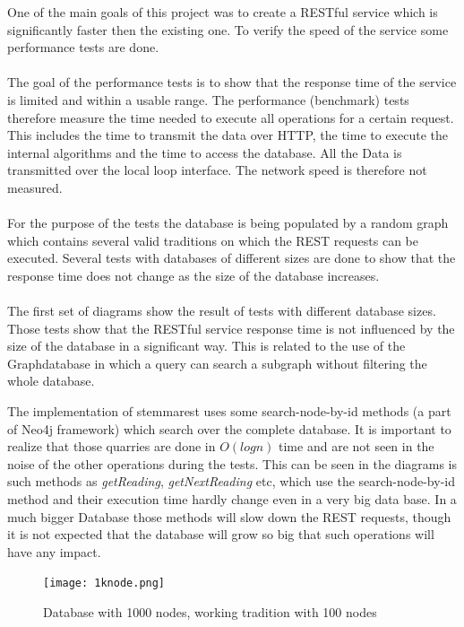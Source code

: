 \documentclass[11pt,fleqn,openany]{book} %
\begin{document}
One of the main goals of this project was to create a RESTful service which is significantly faster then the existing one. To verify the speed of the service some performance tests are done. 
\\ \quad \\
The goal of the performance tests is to show that the response time of the service is limited and within a usable range. The performance (benchmark) tests therefore measure the time needed to execute all operations for a certain request. This includes the time to transmit the data over HTTP, the time to execute the internal algorithms and the time to access the database. All the Data is transmitted over the local loop interface. The network speed is therefore not measured. 
\\ \quad \\
For the purpose of the tests the database is being populated by a random graph which contains several valid traditions on which the REST requests can be executed. Several tests with databases of different sizes are done to show that the response time does not change as the size of the database increases.
\\ \quad \\
The first set of diagrams show the result of tests with different database sizes. Those tests show that the RESTful service response time is not influenced by the size of the database in a significant way. This is related to the use of the Graphdatabase in which a query can search a subgraph without filtering the whole database. 
\begin{remark}
The implementation of stemmarest uses some search-node-by-id methods (a part of Neo4j framework) which search over the complete database. It is important to realize that those quarries are done in $O(log n)$ time and are not seen in the noise of the other operations during the tests. This can be seen in the diagrams is such methods as \textit{getReading}, \textit{getNextReading} etc, which use the search-node-by-id method and their execution time hardly change even in a very big data base. In a much bigger Database those methods will slow down the REST requests, though it is not expected that the database will grow so big that such operations will have any impact.
\end{remark} 

\begin{figure}[h!]
  \caption{Database with 1000 nodes,  working tradition with 100 nodes }
  \centering
    \texttt{[image: 1knode.png]}
\end{figure}
\end{document}
